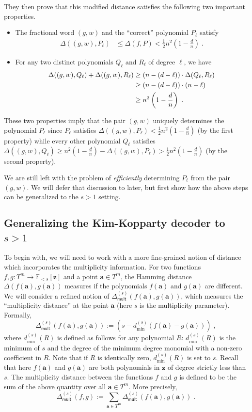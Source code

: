 \documentclass{article}
\def\Field{\mathbb{F}}
\let\F\Field
\def\veca{\mathbf{a}}
\def\vecz{\mathbf{z}}
\newcommand{\vz}{\vecz}
\newcommand{\va}{\veca}
\begin{document}
	They then prove that this modified distance satisfies the following
	two important properties.
	\begin{itemize}
		\item The fractional word $(g,w)$ and the ``correct'' polynomial
		$P_\ell$ satisfy
		\begin{align}\Delta((g,w),P_\ell) &\leq \Delta(f,P) < \frac12
			n^2\left(1-\frac{d}{n}\right)\;.\label{eq:KKprop1}
		\end{align}
		\item For any two distinct polynomials $Q_\ell$ and $R_\ell$ of
		degree $\ell$, we have
		\begin{align}
			\Delta((g,w), Q_\ell) + \Delta((g,w),R_\ell) &\geq
			(n-(d-\ell))\cdot \Delta(Q_\ell,R_\ell)\notag\\
			&\geq
			(n-(d-\ell))
			\cdot
			(n-\ell)\notag\\
			&\geq n^2\left(1
			-\frac{d}{n}\right)\;. \label{eq:KKprop2}
		\end{align}
	\end{itemize}
	These two properties imply that the pair $(g,w)$ uniquely determines
	the polynomial $P_\ell$ since $P_\ell$ satisfies
	$\Delta((g,w),P_\ell) <  \frac12
	n^2\left(1-\frac{d}{n}\right)$ (by the first property) while  every other polynomial $Q_\ell$
	satisfies $\Delta((g,w), Q_\ell) \geq n^2\left(1
	-\frac{d}{n}\right) - \Delta((g,w),P_\ell) > \frac12
	n^2\left(1-\frac{d}{n}\right)$ (by the second property).
	
	We are still left with the problem
	of \emph{efficiently} determining $P_\ell$ from the pair $(g,w)$. We will
	defer that discussion to later, but first show how the above steps
	can be generalized to the $s>1$ setting. 
	
	\subsection{Generalizing the Kim-Kopparty decoder to \texorpdfstring{$s>1$}{s > 1}}
	To begin with, we will need to work with a more fine-grained notion of
	distance which incorporates the multiplicity information. For two
	functions $f, g \colon T^m \to \F_{<s}[\vz]$ and a point $\va \in
	T^m$, the Hamming distance $\Delta(f(\va), g(\va))$ measures if the polynomials $f(\va)$ and
	$g(\va)$ are different. We will consider a refined notion of $\Delta_{\mathsf{mult}}^{(s)}(f(\va),g(\va))$, which measures the
	``multiplicity distance'' at the point $\va$ (here $s$ is the
	multiplicity parameter). Formally, 
	\[ \Delta_{\mathsf{mult}}^{(s)}(f(\va),g(\va)) := (s -
	d^{(s)}_{\min}(f(\va) - g(\va)))\;,\]
	where $d^{(s)}_{\min}(R)$ is defined as follows for any polynomial
	$R$: $d^{(s)}_{\min}(R)$ is the minimum of $s$ and the degree of the
	minimum degree monomial with a non-zero coefficient in $R$. Note that if $R$ is
	identically zero, $d^{(s)}_{\min}(R)$ is set to $s$. Recall that here $f(\va)$ and $g(\va)
	$ are both polynomials in $\vz$ of degree strictly less than $s$. The multiplicity distance between the functions $f$ and $g$ is defined
	to be the sum of the above quantity over all $\va \in T^m$. More
	precisely,
	\[ \Delta_{\mathsf{mult}}^{(s)}(f,g) := \sum_{\va \in T^m}
	\Delta_{\mathsf{mult}}^{(s)}(f(\va),g(\va))\;.
	\]
	
\end{document}
